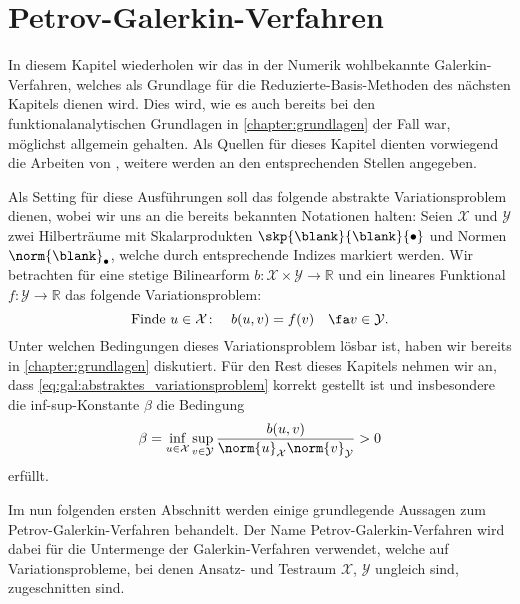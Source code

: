 
\chapter{Petrov-Galerkin-Verfahren} %
\label{chapter:galerkin}

In diesem Kapitel wiederholen wir das in der Numerik wohlbekannte Galerkin-Verfahren, welches als Grundlage für die Reduzierte-Basis-Methoden des nächsten Kapitels dienen wird.
Dies wird, wie es auch bereits bei den funktionalanalytischen Grundlagen in \cref{chapter:grundlagen} der Fall war, möglichst allgemein gehalten.
Als Quellen für dieses Kapitel dienten vorwiegend die Arbeiten von \textcite{Braess:2007wm,Patera:2007un,Quarteroni:2011jm}, weitere werden an den entsprechenden Stellen angegeben.

Als Setting für diese Ausführungen soll das folgende abstrakte Variationsproblem dienen, wobei wir uns an die bereits bekannten Notationen halten: Seien $\mathcal X$ und $\mathcal Y$ zwei Hilberträume mit Skalarprodukten $\skp{\blank}{\blank}{\bullet}$ und Normen $\norm{\blank}_{\bullet}$, welche durch entsprechende Indizes markiert werden.
Wir betrachten für eine stetige Bilinearform $b \colon \mathcal X \times \mathcal Y \to \mathbb{R}$ und ein lineares Funktional $f \colon \mathcal Y \to \mathbb{R}$ das folgende Variationsproblem:
\begin{equation}
    \label{eq:gal:abstraktes_variationsproblem}
    \text{Finde}~u \in \mathcal X \colon \quad  b(u, v) = f(v) \quad \fa v \in \mathcal Y.
\end{equation}
Unter welchen Bedingungen dieses Variationsproblem lösbar ist, haben wir bereits in \cref{chapter:grundlagen} diskutiert.
Für den Rest dieses Kapitels nehmen wir an, dass \cref{eq:gal:abstraktes_variationsproblem} korrekt gestellt ist und insbesondere die inf-sup-Konstante $\beta$ die Bedingung
\begin{equation}
    \label{eq:gal:abstraktes_variationsproblem_infsup}
    \beta = \inf_{u \in \mathcal X} \sup_{v \in \mathcal Y} \frac{b(u, v)}{\norm{u}_{\mathcal X} \norm{v}_{\mathcal Y}} > 0
\end{equation}
erfüllt.

Im nun folgenden ersten Abschnitt werden einige grundlegende Aussagen zum Petrov-Galerkin-Verfahren behandelt.
Der Name Petrov-Galerkin-Verfahren wird dabei für die Untermenge der Galerkin-Verfahren verwendet, welche auf Variationsprobleme, bei denen Ansatz- und Testraum $\mathcal X$, $\mathcal Y$ ungleich sind, zugeschnitten sind.


